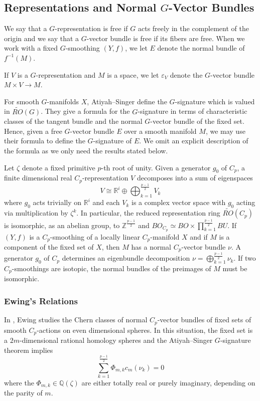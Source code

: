 \documentclass[11pt, twoside]{amsart}
\theoremstyle{plain}
\theoremstyle{definition}
\theoremstyle{remark}
\newcommand{\R}{\mathbb R}
\newcommand{\Q}{\mathbb Q}
\newcommand{\Z}{\mathbb Z}
\newcommand{\ep}{\varepsilon}
\begin{document}
\subsection{Representations and Normal $G$-Vector Bundles}
We say that a $G$-representation is free if $G$ acts freely in the complement of the origin and we say that a $G$-vector bundle is free if its fibers are free.
When we work with a fixed $G$-smoothing $(Y,f)$, we let $E$ denote the normal bundle of $f^{-1}(M)$.

If $V$ is a $G$-representation and $M$ is a space, we let $\ep_V$ denote the $G$-vector bundle $M\times V\rightarrow M$.

For smooth $G$-manifolds $X$, Atiyah--Singer define the $G$-signature which is valued in $\widetilde{RO}(G)$.
They give a formula for the $G$-signature in terms of characteristic classes of the tangent bundle and the normal $G$-vector bundle of the fixed set.
Hence, given a free $G$-vector bundle $E$ over a smooth manifold $M$, we may use their formula to define the $G$-signature of $E$.
We omit an explicit description of the formula as we only need the results stated below.

Let $\zeta$ denote a fixed primitive $p$-th root of unity.
Given a generator $g_0$ of $C_p$, a finite dimensional real $C_p$-representation $V$ decomposes into a sum of eigenspaces
\[
V\cong\R^i\oplus\bigoplus_{k=1}^{\frac{p-1}{2}}V_k
\]
where $g_0$ acts trivially on $\R^i$ and each $V_k$ is a complex vector space with $g_0$ acting via multiplication by $\zeta^k$.
In particular, the reduced representation ring $\widetilde{RO}(C_p)$ is isomorphic, as an abelian group, to $\Z^{\frac{p-1}{2}}$ and $BO_{C_p}\simeq BO\times\prod_{k=1}^{\frac{p-1}{2}}BU$.
If $(Y,f)$ is a $C_p$-smoothing of a locally linear $C_p$-manifold $X$ and if $M$ is a component of the fixed set of $X$, then $M$ has a normal $C_p$-vector bundle $\nu$.
A generator $g_0$ of $C_p$ determines an eigenbundle decomposition $\nu=\bigoplus_{k=1}^{\frac{p-1}{2}}\nu_k$.
If two $C_p$-smoothings are isotopic, the normal bundles of the preimages of $M$ must be isomorphic.

\subsubsection{Ewing's Relations}
In \cite{EwingSpheresAsFPSets}, Ewing studies the Chern classes of normal $C_p$-vector bundles of fixed sets of smooth $C_p$-actions on even dimensional spheres.
In this situation, the fixed set is a $2m$-dimensional rational homology spheres and the Atiyah--Singer $G$-signature theorem implies
\[
\sum_{k=1}^{\frac{p-1}{2}}\Phi_{m,k}c_m(\nu_k)=0
\]
where the $\Phi_{m,k}\in\Q(\zeta)$ are either totally real or purely imaginary, depending on the parity of $m$.
\end{document}
